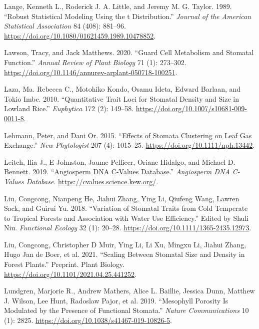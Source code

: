 \documentclass[
  12pt,
]{article}
\newlength{\cslhangindent}
\newlength{\cslentryspacingunit} %
\newenvironment{CSLReferences}[2] %
 {%
  \setlength{\parindent}{0pt}
  \ifodd #1
  \let\oldpar\par
  \def\par{\hangindent=\cslhangindent\oldpar}
  \fi
  \setlength{\parskip}{#2\cslentryspacingunit}
 }%
 {}
\begin{document}
\begin{CSLReferences}{1}{0}
\leavevmode{}%
Lange, Kenneth L., Roderick J. A. Little, and Jeremy M. G. Taylor. 1989. {``Robust {Statistical} {Modeling} {Using} the t {Distribution}.''} \emph{Journal of the American Statistical Association} 84 (408): 881--96. \url{https://doi.org/10.1080/01621459.1989.10478852}.

\leavevmode{}%
Lawson, Tracy, and Jack Matthews. 2020. {``Guard {Cell} {Metabolism} and {Stomatal} {Function}.''} \emph{Annual Review of Plant Biology} 71 (1): 273--302. \url{https://doi.org/10.1146/annurev-arplant-050718-100251}.

\leavevmode{}%
Laza, Ma. Rebecca C., Motohiko Kondo, Osamu Ideta, Edward Barlaan, and Tokio Imbe. 2010. {``Quantitative Trait Loci for Stomatal Density and Size in Lowland Rice.''} \emph{Euphytica} 172 (2): 149--58. \url{https://doi.org/10.1007/s10681-009-0011-8}.

\leavevmode{}%
Lehmann, Peter, and Dani Or. 2015. {``Effects of Stomata Clustering on Leaf Gas Exchange.''} \emph{New Phytologist} 207 (4): 1015--25. \url{https://doi.org/10.1111/nph.13442}.

\leavevmode{}%
Leitch, Ilia J., E Johnston, Jaume Pellicer, Oriane Hidalgo, and Michael D. Bennett. 2019. {``Angiosperm {DNA} {C}-Values Database.''} \emph{Angiosperm DNA C-Values Database}. \url{https://cvalues.science.kew.org/}.

\leavevmode{}%
Liu, Congcong, Nianpeng He, Jiahui Zhang, Ying Li, Qiufeng Wang, Lawren Sack, and Guirui Yu. 2018. {``Variation of Stomatal Traits from Cold Temperate to Tropical Forests and Association with Water Use Efficiency.''} Edited by Shuli Niu. \emph{Functional Ecology} 32 (1): 20--28. \url{https://doi.org/10.1111/1365-2435.12973}.

\leavevmode{}%
Liu, Congcong, Christopher D Muir, Ying Li, Li Xu, Mingxu Li, Jiahui Zhang, Hugo Jan de Boer, et al. 2021. {``Scaling Between Stomatal Size and Density in Forest Plants.''} Preprint. Plant Biology. \url{https://doi.org/10.1101/2021.04.25.441252}.

\leavevmode{}%
Lundgren, Marjorie R., Andrew Mathers, Alice L. Baillie, Jessica Dunn, Matthew J. Wilson, Lee Hunt, Radoslaw Pajor, et al. 2019. {``Mesophyll Porosity Is Modulated by the Presence of Functional Stomata.''} \emph{Nature Communications} 10 (1): 2825. \url{https://doi.org/10.1038/s41467-019-10826-5}.


\end{CSLReferences}
\end{document}
